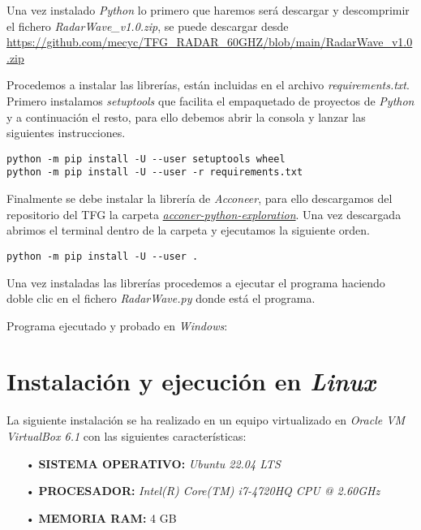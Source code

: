 Una vez instalado \textit{Python} lo primero que haremos será descargar y descomprimir el fichero \textit{RadarWave\_v1.0.zip}, se puede descargar desde \url{https://github.com/mecyc/TFG_RADAR_60GHZ/blob/main/RadarWave_v1.0.zip} 

Procedemos a instalar las librerías, están incluidas en el archivo \textit{requirements.txt}. Primero instalamos \textit{setuptools} que facilita el empaquetado de proyectos de \textit{Python} y a continuación el resto, para ello debemos abrir la consola y lanzar las siguientes instrucciones.

\begin{verbatim}
python -m pip install -U --user setuptools wheel
python -m pip install -U --user -r requirements.txt
\end{verbatim}


Finalmente se debe instalar la librería de \textit{Acconeer}, para ello descargamos del repositorio del TFG la carpeta \href{https://github.com/mecyc/TFG_RADAR_60GHZ/tree/main/acconeer-python-exploration}{\textit{acconer-python-exploration}}. Una vez descargada abrimos el terminal dentro de la carpeta y ejecutamos la siguiente orden.\cite{Acconeer2021}

\begin{verbatim}
python -m pip install -U --user .
\end{verbatim}


Una vez instaladas las librerías procedemos a ejecutar el programa haciendo doble clic en el fichero \textit{RadarWave.py} donde está el programa.

Programa ejecutado y probado en \textit{Windows}:


\section{Instalación y ejecución en \textit{Linux}} \label{sec:linux}

La siguiente instalación se ha realizado en un equipo virtualizado en \textit{Oracle VM VirtualBox 6.1} con las siguientes características:
\begin{itemize}
\item[•] \textbf{SISTEMA OPERATIVO:} \textit{Ubuntu 22.04 LTS}
\item[•] \textbf{PROCESADOR:} \textit{Intel(R) Core(TM) i7-4720HQ CPU @ 2.60GHz}
\item[•] \textbf{MEMORIA RAM:} 4 GB
\end{itemize}

